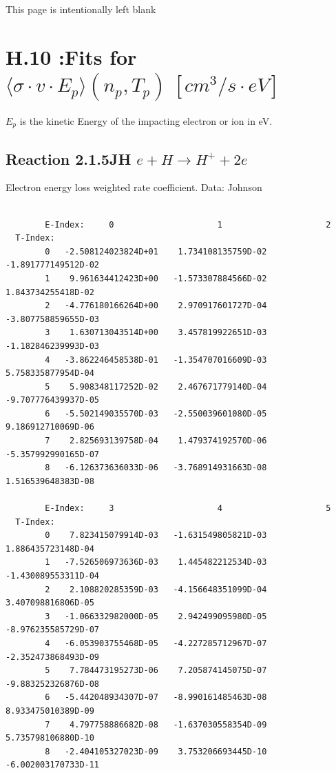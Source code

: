 \documentclass[12pt,dvips]{article}
\begin{document}
\newpage
This page is intentionally left blank
\newpage
\section{H.10 :Fits for $\langle\sigma \cdot v \cdot E_p \rangle (n_p,T_p) \
[cm^3/s \cdot eV]$}

$E_p$ is the kinetic Energy of the impacting electron or ion in eV.

\subsection{
Reaction 2.1.5JH  $ e + H \rightarrow H^+ + 2e $
}

Electron energy loss weighted rate coefficient. Data: Johnson

\begin{small}\begin{verbatim}

        E-Index:     0                     1                     2
  T-Index:
        0   -2.508124023824D+01    1.734108135759D-02   -1.891777149512D-02
        1    9.961634412423D+00   -1.573307884566D-02    1.843734255418D-02
        2   -4.776180166264D+00    2.970917601727D-04   -3.807758859655D-03
        3    1.630713043514D+00    3.457819922651D-03   -1.182846239993D-03
        4   -3.862246458538D-01   -1.354707016609D-03    5.758335877954D-04
        5    5.908348117252D-02    2.467671779140D-04   -9.707776439937D-05
        6   -5.502149035570D-03   -2.550039601080D-05    9.186912710069D-06
        7    2.825693139758D-04    1.479374192570D-06   -5.357992990165D-07
        8   -6.126373636033D-06   -3.768914931663D-08    1.516539648383D-08

        E-Index:     3                     4                     5
  T-Index:
        0    7.823415079914D-03   -1.631549805821D-03    1.886435723148D-04
        1   -7.526506973636D-03    1.445482212534D-03   -1.430089553311D-04
        2    2.108820285359D-03   -4.156648351099D-04    3.407098816806D-05
        3   -1.066332982000D-05    2.942499095980D-05   -8.976235585729D-07
        4   -6.053903755468D-05   -4.227285712967D-07   -2.352473868493D-09
        5    7.784473195273D-06    7.205874145075D-07   -9.883252326876D-08
        6   -5.442048934307D-07   -8.990161485463D-08    8.933475010389D-09
        7    4.797758886682D-08   -1.637030558354D-09    5.735798106880D-10
        8   -2.404105327023D-09    3.753206693445D-10   -6.002003170733D-11


\end{verbatim}
\end{small}
\end{document}

